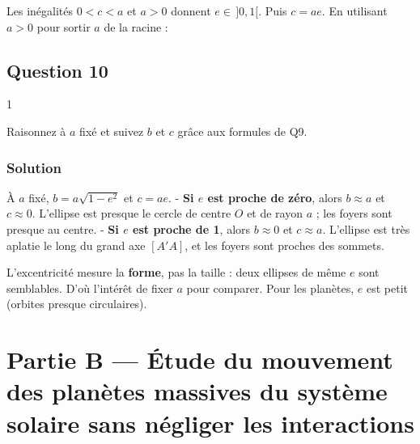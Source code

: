 \documentclass[11pt,a4paper]{article}
\newcommand{\equationajustee}[1]{%
  \sbox{\boiteequation}{$\displaystyle #1$}%
  \ifdim\wd\boiteequation>\linewidth
    \[\resizebox{\linewidth}{!}{\usebox{\boiteequation}}\]%
  \else
    \[#1\]%
  \fi}
\begin{document}
Les inégalités \(0<c<a\) et \(a>0\) donnent \(\boxed{e\in\,]0,1[}\). Puis \(\boxed{c=ae}\).
En utilisant \(a>0\) pour sortir \(a\) de la racine :
\equationajustee{\boxed{\begin{aligned}
b&=\sqrt{a^2-a^2e^2}\\
&=a\sqrt{1-e^2}.
\end{aligned}}}

\hypertarget{question-10}{%
\subsection{Question 10}\label{question-10}}

\begin{indication}{1}

Raisonnez à \(a\) fixé et suivez \(b\) et \(c\) grâce aux formules de Q9.

\end{indication}

\hypertarget{solution-9}{%
\subsubsection{Solution}\label{solution-9}}

À \(a\) fixé, \(b=a\sqrt{1-e^2}\) et \(c=ae\).
- \textbf{Si \(e\) est proche de zéro}, alors \(b\approx a\) et \(c\approx0\). L'ellipse est presque le cercle de centre \(O\) et de rayon \(a\) ; les foyers sont presque au centre.
- \textbf{Si \(e\) est proche de 1}, alors \(b\approx0\) et \(c\approx a\). L'ellipse est très aplatie le long du grand axe \([A'A]\), et les foyers sont proches des sommets.

\begin{methode}

L'excentricité mesure la \textbf{forme}, pas la taille : deux ellipses de même \(e\) sont semblables. D'où l'intérêt de fixer \(a\) pour comparer. Pour les planètes, \(e\) est petit (orbites presque circulaires).

\end{methode}

\hypertarget{partie-b-uxe9tude-du-mouvement-des-planuxe8tes-massives-du-systuxe8me-solaire-sans-nuxe9gliger-les-interactions}{%
\section{Partie B --- Étude du mouvement des planètes massives du système solaire sans négliger les interactions}\label{partie-b-uxe9tude-du-mouvement-des-planuxe8tes-massives-du-systuxe8me-solaire-sans-nuxe9gliger-les-interactions}}
\end{document}
